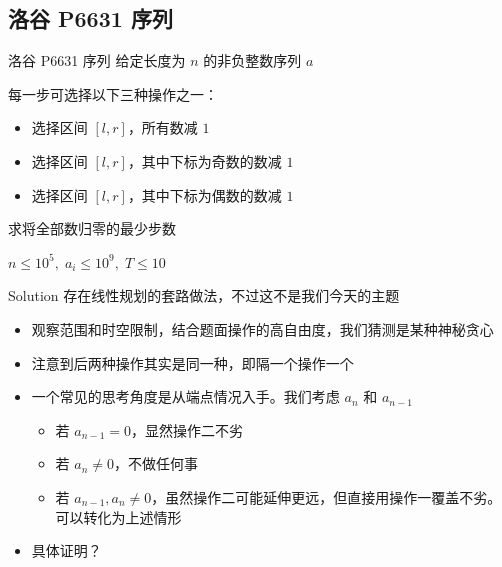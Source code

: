﻿\documentclass[aspectratio=169,handout]{ctexbeamer}
\begin{document}
\subsection{洛谷 P6631 序列}
\begin{frame}{洛谷 P6631 序列}
    给定长度为 $n$ 的非负整数序列 $a$

每一步可选择以下三种操作之一：

\begin{itemize}
    \item 选择区间 $[l,r]$，所有数减 $1$
    \item 选择区间 $[l,r]$，其中下标为奇数的数减 $1$
    \item 选择区间 $[l,r]$，其中下标为偶数的数减 $1$
\end{itemize}

求将全部数归零的最少步数

$n\leq 10^5,\; a_i\leq 10^9,\; T\leq 10$
\end{frame}

\begin{frame}{Solution}
    存在线性规划的套路做法，不过这不是我们今天的主题
    \pause
    \begin{itemize}
        \item 观察范围和时空限制，结合题面操作的高自由度，我们猜测是某种神秘贪心
        \pause
        \item 注意到后两种操作其实是同一种，即隔一个操作一个
        \pause
        \item 一个常见的思考角度是从端点情况入手。我们考虑 $a_n$ 和 $a_{n-1}$
        \pause
        \begin{itemize}
            \item 若 $a_{n-1}=0$，显然操作二不劣
            \item 若 $a_n\neq 0$，不做任何事
            \item 若 $a_{n-1},a_n\neq 0$，虽然操作二可能延伸更远，但直接用操作一覆盖不劣。可以转化为上述情形
        \end{itemize}
        \item 具体证明？
    \end{itemize}
\end{frame}
\end{document}
